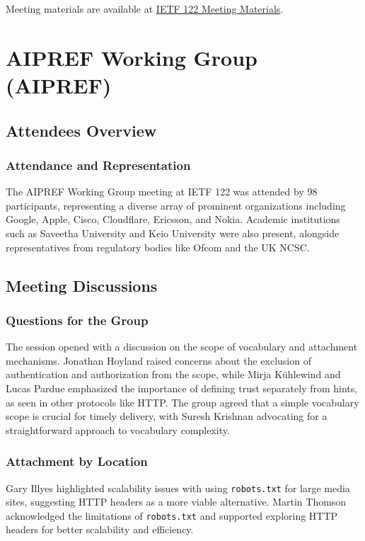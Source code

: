\documentclass{article}
\begin{document}
Meeting materials are available at \href{https://datatracker.ietf.org/meeting/122/materials.html}{IETF 122 Meeting Materials}.




\newpage

\section{AIPREF Working Group (AIPREF)}

\subsection{Attendees Overview}
\subsubsection{Attendance and Representation}
The AIPREF Working Group meeting at IETF 122 was attended by 98 participants, representing a diverse array of prominent organizations including Google, Apple, Cisco, Cloudflare, Ericsson, and Nokia. Academic institutions such as Saveetha University and Keio University were also present, alongside representatives from regulatory bodies like Ofcom and the UK NCSC.

\subsection{Meeting Discussions}
\subsubsection{Questions for the Group}
The session opened with a discussion on the scope of vocabulary and attachment mechanisms. Jonathan Hoyland raised concerns about the exclusion of authentication and authorization from the scope, while Mirja Kühlewind and Lucas Pardue emphasized the importance of defining trust separately from hints, as seen in other protocols like HTTP. The group agreed that a simple vocabulary scope is crucial for timely delivery, with Suresh Krishnan advocating for a straightforward approach to vocabulary complexity.

\subsubsection{Attachment by Location}
Gary Illyes highlighted scalability issues with using \texttt{robots.txt} for large media sites, suggesting HTTP headers as a more viable alternative. Martin Thomson acknowledged the limitations of \texttt{robots.txt} and supported exploring HTTP headers for better scalability and efficiency.
\end{document}
